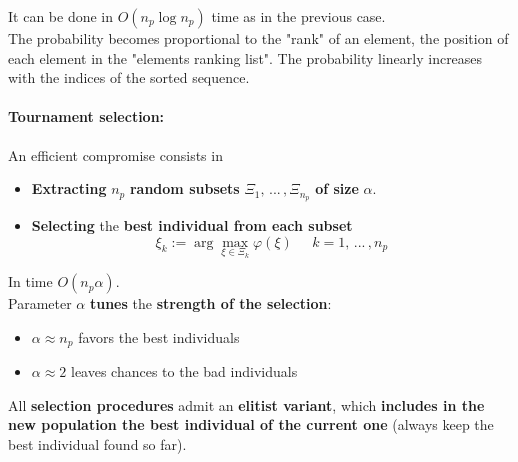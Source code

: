 \documentclass[11pt]{article}
\begin{document}
	It can be done in $O (n_p \log n_p )$ time as in the previous case.\\
	
	The probability becomes proportional to the "rank" of an element, the position of each element in the "elements ranking list". The probability linearly increases with the indices of the sorted sequence.\\
	
	\newpage
	
	\paragraph{Tournament selection:} An efficient compromise consists in
	\begin{itemize}
		\item \textbf{Extracting} $n_p$ \textbf{random subsets} $\Xi_1, \, ... \, , \Xi_{n_p}$ \textbf{of size} $\alpha$.\\
		
		\item \textbf{Selecting} the \textbf{best individual from each subset}
		$$ \xi_k := \arg \max_{\xi \in \Xi_k} \varphi (\xi) \;\;\;\;\; k = 1, \, ... \, , n_p $$
	\end{itemize}
	\nn
	
	In time $O (n_p \alpha)$.\\
	
	Parameter $\alpha$ \textbf{tunes} the \textbf{strength of the selection}:
	\begin{itemize}
		\item $\alpha \approx n_p$ favors the best individuals
		\item $\alpha \approx 2$ leaves chances to the bad individuals
	\end{itemize} 
	
	\nn \nn
	
	All \textbf{selection procedures} admit an \textbf{elitist variant}, which \textbf{includes in the new population the best individual of the current one} (always keep the best individual found so far).\\
	
	
	\newpage
	
\end{document}
